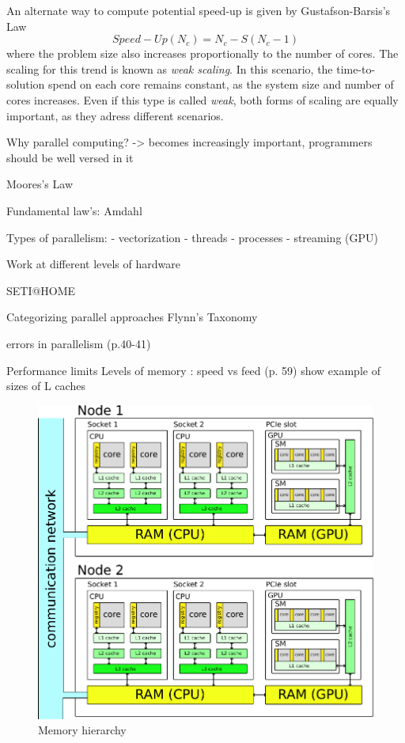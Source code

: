 An alternate way to compute potential speed-up is given by Gustafson-Barsis's Law
\begin{equation}
Speed-Up(N_c) = N_c - S(N_c-1)
\end{equation}
\noindent where the problem size also increases proportionally to the number of cores. The scaling for this trend is known as \emph{weak scaling}. In this scenario, the time-to-solution spend on each core remains constant, as the system size and number of cores increases. Even if this type is called \emph{weak}, both forms of scaling are equally important, as they adress different scenarios.  

Why parallel computing?
-> becomes increasingly important, programmers should be well versed in it

Moores's Law

Fundamental law's: Amdahl

Types of parallelism:
- vectorization
- threads
- processes
- streaming (GPU)

Work at different levels of hardware

SETI@HOME

Categorizing parallel approaches Flynn's Taxonomy

errors in parallelism (p.40-41)

Performance limits
Levels of memory : speed vs feed (p. 59) show example of sizes of L caches

\begin{figure}
\centering
\includegraphics[scale=1.0]{Pics/memory}
\caption{Memory hierarchy}
\end{figure}